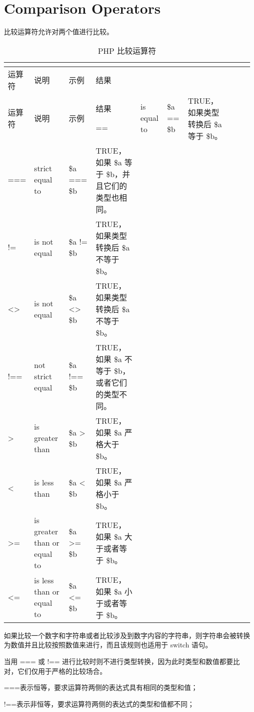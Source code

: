 \section{Comparison Operators}

比较运算符允许对两个值进行比较。

\begin{longtable}{|m{30pt}|m{90pt}|m{40pt}|m{180pt}|}
\tabularnewline\hline
运算符	&说明	&示例	&结果
\endhead

\caption{PHP 比较运算符}\\
\hline
运算符	&说明	&示例	&结果
\endfirsthead

\endfoot

\endlastfoot
\hline
=\/=	& is equal to&\$a == \$b					&TRUE，如果类型转换后 \$a 等于 \$b。\\
\hline
=\/=\/=& strict equal to&\$a =\/=\/= \$b 		&TRUE，如果 \$a 等于 \$b，并且它们的类型也相同。\\
\hline
!\/=	&is not equal&	\$a != \$b				&TRUE，如果类型转换后 \$a 不等于 \$b。\\
\hline
<\/>&is not equal	&\$a <\/> \$b 			&TRUE，如果类型转换后 \$a 不等于 \$b。\\
\hline
!==& not strict equal& \$a !== \$b 	&TRUE，如果 \$a 不等于 \$b，或者它们的类型不同。\\
\hline
>	&is greater than	&\$a > \$b				&TRUE，如果 \$a 严格大于 \$b。\\
\hline
<	&is less than	&\$a < \$b				&TRUE，如果 \$a 严格小于 \$b。\\
\hline
>\/=	&is greater than or equal to &\$a >= \$b&TRUE，如果 \$a 大于或者等于 \$b。\\
\hline
<\/=	&is less than or equal to&\$a <= \$b	&TRUE，如果 \$a 小于或者等于 \$b。\\
\hline

\end{longtable}


如果比较一个数字和字符串或者比较涉及到数字内容的字符串，则字符串会被转换为数值并且比较按照数值来进行，而且该规则也适用于 switch 语句。

当用 === 或 !== 进行比较时则不进行类型转换，因为此时类型和数值都要比对，它们仅用于严格的比较场合。

\begin{compactitem}
\item ===表示恒等，要求运算符两侧的表达式具有相同的类型和值；
\item !==表示非恒等，要求运算符两侧的表达式的类型和值都不同；
\end{compactitem}

